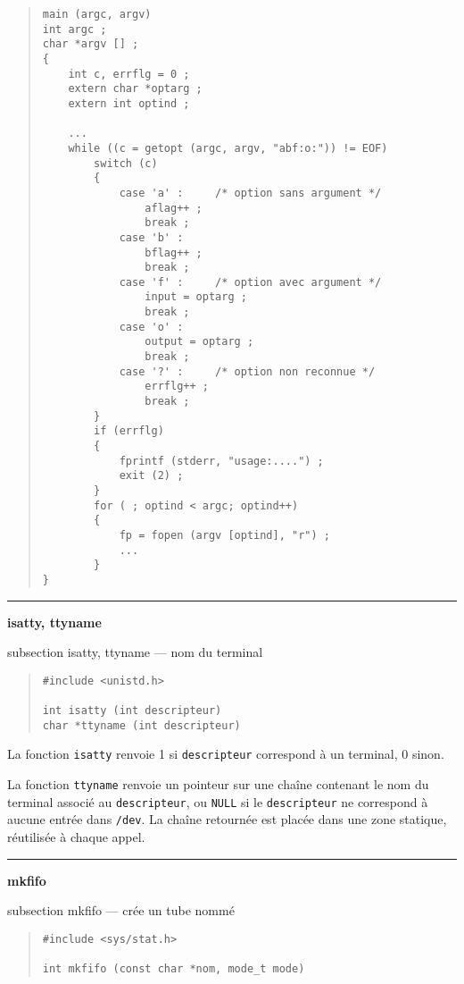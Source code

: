 \documentclass [twoside] {report}
\newcommand {\primitive} [1]
    {
	\phantomsection
	{\large \bf #1}
	\addcontentsline {toc} {subsection} {#1}
    }
\newcommand {\separation}
    {
	\vspace {5mm}
	\nopagebreak
	\hrule
    }
\begin{document}
\begin {quote}
\begin {verbatim}
main (argc, argv)
int argc ;
char *argv [] ;
{
    int c, errflg = 0 ;
    extern char *optarg ;
    extern int optind ;

    ...
    while ((c = getopt (argc, argv, "abf:o:")) != EOF)
        switch (c)
        {
            case 'a' :     /* option sans argument */
                aflag++ ;
                break ;
            case 'b' :
                bflag++ ;
                break ;
            case 'f' :     /* option avec argument */
                input = optarg ;
                break ;
            case 'o' :
                output = optarg ;
                break ;
            case '?' :     /* option non reconnue */
                errflg++ ;
                break ;
        }
        if (errflg)
        {
            fprintf (stderr, "usage:....") ;
            exit (2) ;
        }
        for ( ; optind < argc; optind++)
        {
            fp = fopen (argv [optind], "r") ;
            ...
        }
}
\end{verbatim}
\end {quote}


\separation 
\primitive {isatty, ttyname} --- nom du terminal

\begin {quote}
\begin {verbatim}
#include <unistd.h>

int isatty (int descripteur)
char *ttyname (int descripteur)
\end{verbatim}
\end {quote}

La fonction {\tt isatty} renvoie 1 si {\tt descripteur} correspond
à un terminal, 0 sinon.

La fonction {\tt ttyname} renvoie un pointeur sur une chaîne contenant
le nom du terminal associé au {\tt descripteur}, ou {\tt NULL} si le
{\tt descripteur} ne correspond à aucune entrée dans {\tt /dev}. La
chaîne retournée est placée dans une zone statique, réutilisée à chaque
appel.



\separation
\primitive {mkfifo} --- crée un tube nommé
    \label {mkfifo}

\begin {quote}
\begin {verbatim}
#include <sys/stat.h>

int mkfifo (const char *nom, mode_t mode)
\end{verbatim}
\end {quote}
\end{document}
